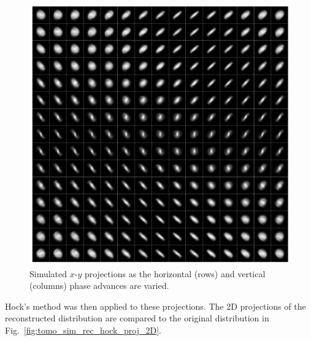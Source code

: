 \begin{figure}[!p]
    \centering
    \includegraphics[width=\textwidth]{Images/chapter4/tomo_sim_target_scan2.png}
    \caption{Simulated $x$-$y$ projections as the horizontal (rows) and vertical (columns) phase advances are varied.}
    \label{fig:tomo_sim_target_scan}
\end{figure}
%
Hock's method was then applied to these projections. The 2D projections of the reconstructed distribution are compared to the original distribution in Fig.~\ref{fig:tomo_sim_rec_hock_proj_2D}.
%
